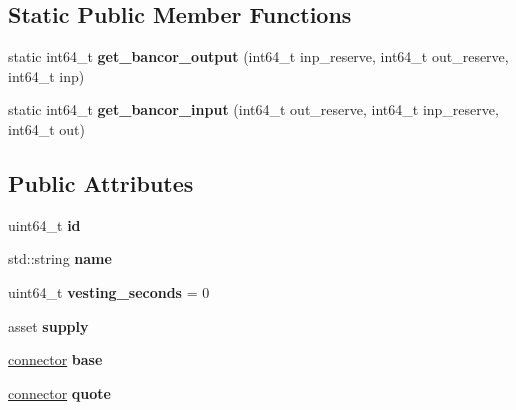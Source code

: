 \subsection*{Static Public Member Functions}
\begin{DoxyCompactItemize}
\item 
\mbox{\label{structeosio_1_1exchange__state_a0e72bc9a390597473b2b4dffe1b1c0c7}} 
static int64\+\_\+t {\bfseries get\+\_\+bancor\+\_\+output} (int64\+\_\+t inp\+\_\+reserve, int64\+\_\+t out\+\_\+reserve, int64\+\_\+t inp)
\item 
\mbox{\label{structeosio_1_1exchange__state_ad3d84959d40c58254006e1899d457936}} 
static int64\+\_\+t {\bfseries get\+\_\+bancor\+\_\+input} (int64\+\_\+t out\+\_\+reserve, int64\+\_\+t inp\+\_\+reserve, int64\+\_\+t out)
\end{DoxyCompactItemize}
\subsection*{Public Attributes}
\begin{DoxyCompactItemize}
\item 
\mbox{\label{structeosio_1_1exchange__state_a4d35841f45023da1581009f2c31e5554}} 
uint64\+\_\+t {\bfseries id}
\item 
\mbox{\label{structeosio_1_1exchange__state_ae17e71b1667a49752fb5b61794ffc915}} 
std\+::string {\bfseries name}
\item 
\mbox{\label{structeosio_1_1exchange__state_a22bcaa59ba37c0ede7270f05bedd8f27}} 
uint64\+\_\+t {\bfseries vesting\+\_\+seconds} = 0
\item 
\mbox{\label{structeosio_1_1exchange__state_a008ffaf59e6747087b39d58ad4d1907d}} 
asset {\bfseries supply}
\item 
\mbox{\label{structeosio_1_1exchange__state_ab6fc4150a3d9c76cf0c8b80f2f307141}} 
\mbox{\hyperlink{structeosio_1_1exchange__state_1_1connector}{connector}} {\bfseries base}
\item 
\mbox{\label{structeosio_1_1exchange__state_a113d14fa6ef420fbcb91cff8f67633ef}} 
\mbox{\hyperlink{structeosio_1_1exchange__state_1_1connector}{connector}} {\bfseries quote}
\end{DoxyCompactItemize}


